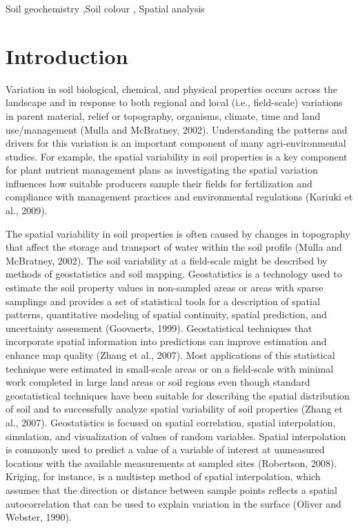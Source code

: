\documentclass[
  number]{elsarticle}
\begin{document}
\begin{frontmatter}
\begin{keyword}
    Soil geochemistry \sep Soil colour \sep 
    Spatial analysis
\end{keyword}
\end{frontmatter}
    
\section{Introduction}\label{introduction}

Variation in soil biological, chemical, and physical properties occurs
across the landscape and in response to both regional and local (i.e.,
field-scale) variations in parent material, relief or topography,
organisms, climate, time and land use/management (Mulla and McBratney,
2002). Understanding the patterns and drivers for this variation is an
important component of many agri-environmental studies. For example, the
spatial variability in soil properties is a key component for plant
nutrient management plans as investigating the spatial variation
influences how suitable producers sample their fields for fertilization
and compliance with management practices and environmental regulations
(Kariuki et al., 2009).

The spatial variability in soil properties is often caused by changes in
topography that affect the storage and transport of water within the
soil profile (Mulla and McBratney, 2002). The soil variability at a
field-scale might be described by methods of geostatistics and soil
mapping. Geostatistics is a technology used to estimate the soil
property values in non-sampled areas or areas with sparse samplings and
provides a set of statistical tools for a description of spatial
patterns, quantitative modeling of spatial continuity, spatial
prediction, and uncertainty assessment (Goovaerts, 1999). Geostatistical
techniques that incorporate spatial information into predictions can
improve estimation and enhance map quality (Zhang et al., 2007). Most
applications of this statistical technique were estimated in small-scale
areas or on a field-scale with minimal work completed in large land
areas or soil regions even though standard geostatistical techniques
have been suitable for describing the spatial distribution of soil and
to successfully analyze spatial variability of soil properties (Zhang et
al., 2007). Geostatistics is focused on spatial correlation, spatial
interpolation, simulation, and visualization of values of random
variables. Spatial interpolation is commonly used to predict a value of
a variable of interest at unmeasured locations with the available
measurements at sampled sites (Robertson, 2008). Kriging, for instance,
is a multistep method of spatial interpolation, which assumes that the
direction or distance between sample points reflects a spatial
autocorrelation that can be used to explain variation in the surface
(Oliver and Webster, 1990).
\end{document}
